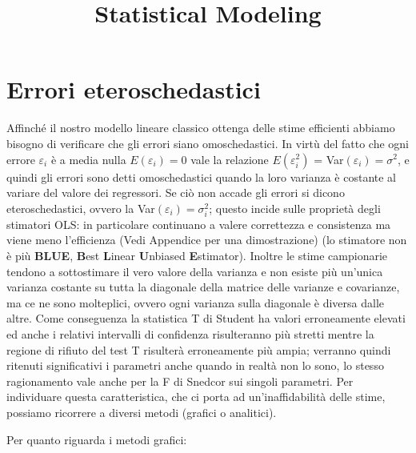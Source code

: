 \documentclass[a4page, 11pt]{article} %
\title{Statistical Modeling}
\author{}
\date{}
\begin{document}
\maketitle

\section{Errori eteroschedastici}
Affinché il nostro modello lineare classico ottenga delle stime efficienti abbiamo bisogno di verificare che gli errori siano omoschedastici. 
In virtù del fatto che ogni errore $\varepsilon_i$ è a media nulla $E(\varepsilon_i) = 0$ vale la relazione $E(\varepsilon_i^2)$ = Var$(\varepsilon_i) = \sigma^2$, e quindi gli errori sono detti omoschedastici quando la loro varianza è costante al variare del valore dei regressori.
Se ciò non accade gli errori si dicono eteroschedastici, ovvero la Var$(\varepsilon_i) = \sigma_i^2$; questo incide sulle proprietà degli stimatori OLS: in particolare continuano a valere correttezza e consistenza ma viene meno l’efficienza (Vedi Appendice per una dimostrazione) %
(lo stimatore non è più \textbf{BLUE}, \textbf{B}est \textbf{L}inear \textbf{U}nbiased \textbf{E}stimator). 
Inoltre le stime campionarie tendono a sottostimare il vero valore della varianza e non esiste più un’unica varianza costante su tutta la diagonale della matrice delle varianze e covarianze, ma ce ne sono molteplici, ovvero ogni varianza sulla diagonale è diversa dalle altre. 
Come conseguenza la statistica T di Student ha valori erroneamente elevati ed anche i relativi intervalli di confidenza risulteranno più stretti mentre la regione di rifiuto del test T risulterà erroneamente più ampia; verranno quindi ritenuti significativi i parametri anche quando in realtà non lo sono, lo stesso ragionamento vale anche per la F di Snedcor sui singoli parametri.
Per individuare questa caratteristica, che ci porta ad un’inaffidabilità delle stime, possiamo ricorrere a diversi metodi (grafici o analitici).

Per quanto riguarda i metodi grafici:
\end{document}
